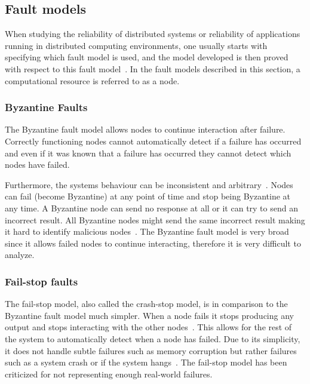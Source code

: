 \documentclass{cslthse-msc}
\begin{document}
\subsection{Fault models} \label{subsec:background_fault_models}
When studying the reliability of distributed systems or reliability of applications running in distributed computing environments, one usually starts with specifying which fault model is used, and the model developed is then proved with respect to this fault model~\cite{faultTolerantFundamentals}. In the fault models described in this section, a computational resource is referred to as a node.

\subsubsection{Byzantine Faults} \label{subsub:background_byzantine}
The Byzantine fault model allows nodes to continue interaction after failure. Correctly functioning nodes cannot automatically detect if a failure has occurred and even if it was known that a failure has occurred they cannot detect which nodes have failed. 

Furthermore, the systems behaviour can be inconsistent and arbitrary~\cite{surveyFaultParallel}. Nodes can fail (become Byzantine) at any point of time and stop being Byzantine at any time. A Byzantine node can send no response at all or it can try to send an incorrect result. All Byzantine nodes might send the same incorrect result making it hard to identify malicious nodes~\cite{selfAdaptRel}. %
The Byzantine fault model is very broad since it allows failed nodes to continue interacting, therefore it is very difficult to analyze.


\subsubsection{Fail-stop faults} \label{subsub:background_fail_stop}
The fail-stop model, also called the crash-stop model, is in comparison to the Byzantine fault model much simpler. When a node fails it stops producing any output and stops interacting with the other nodes~\cite{faultTolerantFundamentals}. This allows for the rest of the system to automatically detect when a node has failed. Due to its simplicity, it does not handle subtle failures such as memory corruption but rather failures such as a system crash or if the system hangs~\cite{surveyFaultParallel}. The fail-stop model has been criticized for not representing enough real-world failures.
\end{document}
